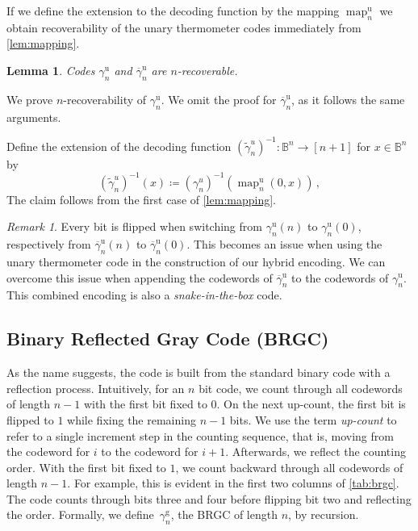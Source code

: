 \documentclass[9pt,journal,compsoc]{IEEEtran}
\newtheorem{lemma}[theorem]{Lemma}
\theoremstyle{remark}
\newtheorem*{remark}{Remark}
\DeclareMathOperator{\map}{map}
\newcommand{\IB}{\mathbb{B}}
\newcommand{\gBRGC}[1]{\gamma_{#1}^{\operatorname{g}}}
\newcommand{\gUnary}[1]{\gamma_{#1}^{\operatorname{u}}}
\newcommand{\gbUnary}[1]{\overline{\gamma}_{#1}^{\operatorname{u}}}
\newcommand{\mUnary}[1]{\map_{#1}^{\operatorname{u}}}
\begin{document}
If we define the extension to the decoding function by the mapping
  $\mUnary{n}$ we obtain recoverability of the unary thermometer codes
  immediately from \cref{lem:mapping}.

\begin{lemma}\label{lem:unaryrecov}
  Codes $\gUnary{n}$ and $\gbUnary{n}$ are $n$-recoverable.
\end{lemma}

\begin{IEEEproof}
  We prove $n$-recoverability of $\gUnary{n}$.
  We omit the proof for $\gbUnary{n}$, as it follows the same arguments.

  Define the extension of the decoding function 
    $(\widetilde{\gamma}^u_n)^{-1}\colon\IB^n\rightarrow[n+1]$
    for $x\in\IB^n$ by
  \begin{equation*}
    (\widetilde{\gamma}^u_n)^{-1}(x)\coloneqq(\gamma^u_n)^{-1}(\mUnary{n}(0,x))\,,
  \end{equation*}
  The claim follows from the first case of \cref{lem:mapping}.
\end{IEEEproof}

\begin{remark}
  Every bit is flipped when switching from $\gUnary{n}(n)$ to $\gUnary{n}(0)$,
    respectively from $\gbUnary{n}(n)$ to $\gbUnary{n}(0)$.
  This becomes an issue when using the unary thermometer code in the construction
   of our hybrid encoding.
  We can overcome this issue when appending the codewords of $\gbUnary{n}$ to the
    codewords of $\gUnary{n}$.
  This combined encoding is also a \emph{snake-in-the-box} code.
\end{remark}

\subsection{Binary Reflected Gray Code (BRGC)}

As the name suggests, the code is built from the standard binary code with a
  reflection process. 
Intuitively, for an $n$ bit code, we count through all codewords of length $n-1$ 
  with the first bit fixed to $0$. 
On the next up-count, the first bit is flipped to $1$ while fixing the remaining
  $n-1$ bits. 
  We use the term \emph{up-count} to refer to a single increment step in the counting sequence, that is, moving from the codeword for $i$ to the codeword for $i+1$. 
Afterwards, we reflect the counting order.
With the first bit fixed to $1$, we count backward through all codewords of 
  length $n-1$.  
For example, this is evident in the first two columns of \cref{tab:brgc}.
The code counts through bits three and four before flipping bit two and 
  reflecting the order.
Formally, we define~$\gBRGC{n}$, the BRGC of length $n$, by recursion.
\end{document}
